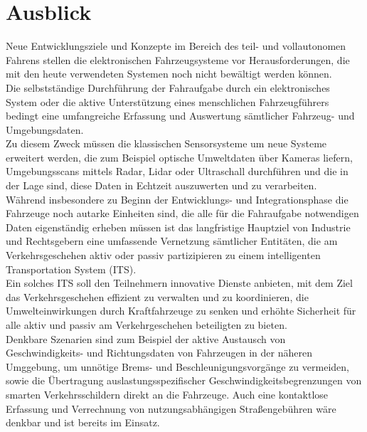 \section{Ausblick}

    Neue Entwicklungsziele und Konzepte im Bereich des teil- und vollautonomen Fahrens stellen die elektronischen Fahrzeugsysteme vor Herausforderungen, die mit den heute
    verwendeten Systemen noch nicht bewältigt werden können.\\
    Die selbstständige Durchführung der Fahraufgabe durch ein elektronisches System oder die aktive Unterstützung eines menschlichen Fahrzeugführers
    bedingt eine umfangreiche Erfassung und Auswertung sämtlicher Fahrzeug- und Umgebungsdaten.\\
    Zu diesem Zweck müssen die klassischen Sensorsysteme um neue Systeme erweitert werden, die zum Beispiel optische Umweltdaten über Kameras liefern, Umgebungsscans
    mittels Radar, Lidar oder Ultraschall durchführen und die in der Lage sind, diese Daten in Echtzeit auszuwerten und zu verarbeiten. ~\cite{BP06}\\

    Während insbesondere zu Beginn der Entwicklungs- und Integrationsphase die Fahrzeuge noch autarke Einheiten sind, die alle für die
    Fahraufgabe notwendigen Daten eigenständig erheben müssen ist das langfristige Hauptziel von Industrie und Rechtsgebern eine umfassende Vernetzung
    sämtlicher Entitäten, die am Verkehrsgeschehen aktiv oder passiv partizipieren zu einem intelligenten Transportation System (ITS).\\

    Ein solches ITS soll den Teilnehmern innovative Dienste anbieten, mit dem Ziel das Verkehrsgeschehen
    effizient zu verwalten und zu koordinieren, die Umwelteinwirkungen durch Kraftfahrzeuge zu senken und erhöhte Sicherheit für alle 
    aktiv und passiv am Verkehrgeschehen beteiligten zu bieten. ~\cite{BP04} \cite{BP11}\\

    Denkbare Szenarien sind zum Beispiel der aktive Austausch von Geschwindigkeits- und Richtungsdaten von Fahrzeugen in der näheren Umggebung, um unnötige Brems-
    und Beschleunigungsvorgänge zu vermeiden, sowie die Übertragung auslastungsspezifischer Geschwindigkeitsbegrenzungen von smarten Verkehrsschildern
    direkt an die Fahrzeuge. Auch eine kontaktlose Erfassung und Verrechnung von nutzungsabhängigen Straßengebühren wäre denkbar und ist bereits im Einsatz.\\

